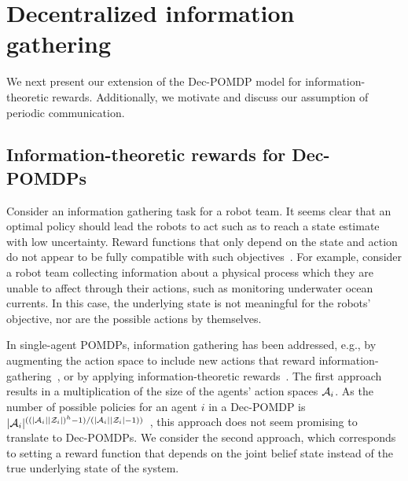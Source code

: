 \section{Decentralized information gathering}
\label{sec:infodecpomdp}
We next present our extension of the Dec-POMDP model for information-theoretic rewards.
Additionally, we motivate and discuss our assumption of periodic communication.

\subsection{Information-theoretic rewards for Dec-POMDPs}
Consider an information gathering task for a robot team.
It seems clear that an optimal policy should lead the robots to act such as to reach a state estimate with low uncertainty.
Reward functions that only depend on the state and action do not appear to be fully compatible with such objectives~\cite{Araya2010}.
For example, consider a robot team collecting information about a physical process which they are unable to affect through their actions, such as monitoring underwater ocean currents.
In this case, the underlying state is not meaningful for the robots' objective, nor are the possible actions by themselves.

In single-agent POMDPs, information gathering has been addressed, e.g., by augmenting the action space to include new actions that reward information-gathering~\cite{Spaan2010,Spaan2015}, or by applying information-theoretic rewards~\cite{Araya2010}.
The first approach results in a multiplication of the size of the agents' action spaces $\mathcal{A}_i$.
As the number of possible policies for an agent $i$ in a Dec-POMDP is $|\mathcal{A}_i|^{((|\mathcal{A}_i||\mathcal{Z}_i|)^h-1) / (|\mathcal{A}_i||\mathcal{Z}_i|-1))}$~\cite{Oliehoek2008}, this approach does not seem promising to translate to Dec-POMDPs.
We consider the second approach, which corresponds to setting a reward function that depends on the joint belief state instead of the true underlying state of the system.


